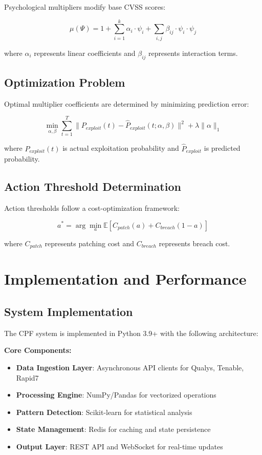 \documentclass[11pt,a4paper]{article}
\begin{document}
Psychological multipliers modify base CVSS scores:

\begin{equation}
\mu(\Psi) = 1 + \sum_{i=1}^{k} \alpha_i \cdot \psi_i + \sum_{i,j} \beta_{ij} \cdot \psi_i \cdot \psi_j
\end{equation}

where $\alpha_i$ represents linear coefficients and $\beta_{ij}$ represents interaction terms.

\subsection{Optimization Problem}

Optimal multiplier coefficients are determined by minimizing prediction error:

\begin{equation}
\min_{\alpha, \beta} \sum_{t=1}^{T} \|P_{exploit}(t) - \hat{P}_{exploit}(t; \alpha, \beta)\|^2 + \lambda \|\alpha\|_1
\end{equation}

where $P_{exploit}(t)$ is actual exploitation probability and $\hat{P}_{exploit}$ is predicted probability.

\subsection{Action Threshold Determination}

Action thresholds follow a cost-optimization framework:

\begin{equation}
a^* = \arg\min_a \mathbb{E}[C_{patch}(a) + C_{breach}(1-a)]
\end{equation}

where $C_{patch}$ represents patching cost and $C_{breach}$ represents breach cost.

\section{Implementation and Performance}

\subsection{System Implementation}

The CPF system is implemented in Python 3.9+ with the following architecture:

\textbf{Core Components:}
\begin{itemize}
\item \textbf{Data Ingestion Layer}: Asynchronous API clients for Qualys, Tenable, Rapid7
\item \textbf{Processing Engine}: NumPy/Pandas for vectorized operations
\item \textbf{Pattern Detection}: Scikit-learn for statistical analysis
\item \textbf{State Management}: Redis for caching and state persistence
\item \textbf{Output Layer}: REST API and WebSocket for real-time updates
\end{itemize}
\end{document}
